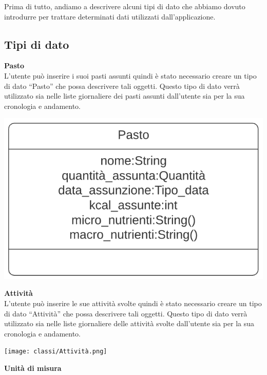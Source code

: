 \documentclass{article}
\begin{document}
      Prima di tutto, andiamo a descrivere alcuni tipi di dato che abbiamo dovuto introdurre per trattare determinati dati utilizzati
      dall’applicazione.\\

      \subsection{Tipi di dato}
      {\large\textbf{Pasto}}\\

      L’utente può inserire i suoi pasti assunti quindi è stato necessario creare un tipo di dato “Pasto” che possa descrivere tali oggetti. Questo tipo di dato verrà utilizzato sia nelle liste giornaliere dei pasti assunti dall’utente sia per la sua cronologia e andamento.\\
      \begin{center}
            \includegraphics[scale=0.5]{images/classi/Pasto.png}
      \end{center}
      {\large\textbf{Attività}}\\

      L’utente può inserire le sue attività svolte quindi è stato necessario creare un tipo di dato “Attività” che possa descrivere tali oggetti. Questo tipo di dato verrà utilizzato sia nelle liste giornaliere delle attività svolte dall’utente sia per la sua cronologia e andamento.\\
      \begin{center}
            \texttt{[image: classi/Attività.png]}

            
      \end{center}

      {\large\textbf{Unità di misura}}\\
\end{document}
